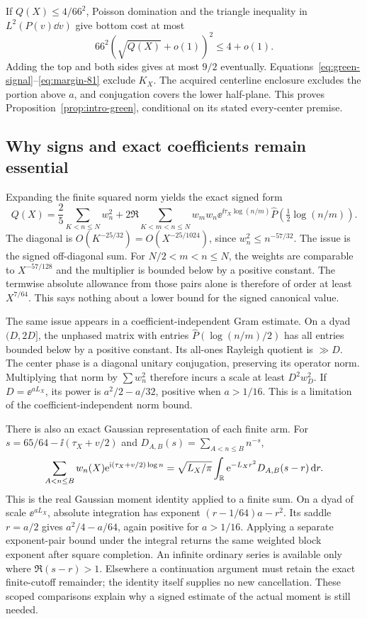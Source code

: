 If $Q(X)\le4/66^2$, Poisson domination and the triangle inequality
in $L^2(P(v)\dd v)$ give bottom cost at most
\[
 66^2(\sqrt{Q(X)}+o(1))^2\le4+o(1).
\]
Adding the top and both sides gives at most $9/2$ eventually.
Equations~\eqref{eq:green-signal}--\eqref{eq:margin-81} exclude $K_X$.
The acquired centerline enclosure excludes the portion above $a$,
and conjugation covers the lower half-plane. This proves
Proposition~\ref{prop:intro-green}, conditional on its stated
every-center premise.

\subsection{Why signs and exact coefficients remain essential}

Expanding the finite squared norm yields the exact signed form
\begin{equation}\label{eq:Q-pairs}
 Q(X)=\frac25\sum_{K<n\le N}w_n^2
 +2\Re\sum_{K<m<n\le N}w_mw_n\ee^{\ii\tau_X\log(n/m)}
              \widehat P\left(\tfrac12\log(n/m)\right).
\end{equation}
The diagonal is $O(K^{-25/32})=O(X^{-25/1024})$, since
$w_n^2\le n^{-57/32}$. The issue is the signed off-diagonal sum.
For $N/2<m<n\le N$, the weights are comparable to $X^{-57/128}$
and the multiplier is bounded below by a positive constant.
The termwise absolute allowance from those pairs alone is therefore
of order at least $X^{7/64}$. This says nothing about a lower bound
for the signed canonical value.

The same issue appears in a coefficient-independent Gram estimate.
On a dyad $(D,2D]$, the unphased matrix with entries
$\widehat P(\log(n/m)/2)$ has all entries bounded below by a
positive constant. Its all-ones Rayleigh quotient is $\gg D$.
The center phase is a diagonal unitary conjugation, preserving its
operator norm. Multiplying that norm by $\sum w_n^2$ therefore
incurs a scale at least $D^2w_D^2$. If $D=\ee^{aL_X}$, its power
is $a^2/2-a/32$, positive when $a>1/16$.
This is a limitation of the coefficient-independent norm bound.

There is also an exact Gaussian representation of each finite arm.
For $s=65/64-\ii(\tau_X+v/2)$ and
$D_{A,B}(s)=\sum_{A<n\le B}n^{-s}$,
\begin{equation}\label{eq:weight-gaussian}
 \sum_{A<n\le B}w_n(X)\mathrm e^{\mathrm i(\tau_X+v/2)\log n}
 =\sqrt{L_X/\pi}\int_\mathbb R\mathrm e^{-L_Xr^2}D_{A,B}(s-r)\,\mathrm d r.
\end{equation}
This is the real Gaussian moment identity applied to a finite sum.
On a dyad of scale $\ee^{aL_X}$, absolute integration has exponent
$(r-1/64)a-r^2$. Its saddle $r=a/2$ gives $a^2/4-a/64$,
again positive for $a>1/16$. Applying a separate exponent-pair bound
under the integral returns the same weighted block exponent after
square completion. An infinite ordinary series is available only
where $\Re(s-r)>1$. Elsewhere a continuation argument must retain
the exact finite-cutoff remainder; the identity itself supplies no
new cancellation. These scoped comparisons explain why a signed
estimate of the actual moment is still needed.
